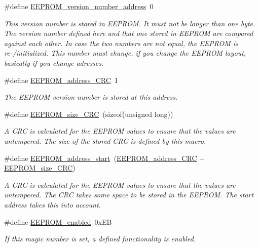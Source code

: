 \begin{DoxyCompactItemize}
\#define \hyperlink{WIFIOnOff_8ino_a573ec4699f45eaca686a077e5881d66b}{E\-E\-P\-R\-O\-M\-\_\-version\-\_\-number\-\_\-address}~0
\begin{DoxyCompactList}\small\item\em This version number is stored in E\-E\-P\-R\-O\-M. It must not be longer than one byte. The version number defined here and that one stored in E\-E\-P\-R\-O\-M are compared against each other. In case the two numbers are not equal, the E\-E\-P\-R\-O\-M is re-\//initialized. This number must change, if you change the E\-E\-P\-R\-O\-M layout, basically if you change adresses. \end{DoxyCompactList}\item 
\#define \hyperlink{WIFIOnOff_8ino_ab384daae78d017828d89c6d9c697021a}{E\-E\-P\-R\-O\-M\-\_\-address\-\_\-\-C\-R\-C}~1
\begin{DoxyCompactList}\small\item\em The E\-E\-P\-R\-O\-M version number is stored at this address. \end{DoxyCompactList}\item 
\#define \hyperlink{WIFIOnOff_8ino_af12bb22226c8f91f856f93ef2ddad3ec}{E\-E\-P\-R\-O\-M\-\_\-size\-\_\-\-C\-R\-C}~(sizeof(unsigned long))
\begin{DoxyCompactList}\small\item\em A C\-R\-C is calculated for the E\-E\-P\-R\-O\-M values to ensure that the values are untempered. The size of the stored C\-R\-C is defined by this macro. \end{DoxyCompactList}\item 
\#define \hyperlink{WIFIOnOff_8ino_a4e45a9ad8583fe2db7f42052e0a7ac95}{E\-E\-P\-R\-O\-M\-\_\-address\-\_\-start}~(\hyperlink{WIFIOnOff_8ino_ab384daae78d017828d89c6d9c697021a}{E\-E\-P\-R\-O\-M\-\_\-address\-\_\-\-C\-R\-C} + \hyperlink{WIFIOnOff_8ino_af12bb22226c8f91f856f93ef2ddad3ec}{E\-E\-P\-R\-O\-M\-\_\-size\-\_\-\-C\-R\-C})
\begin{DoxyCompactList}\small\item\em A C\-R\-C is calculated for the E\-E\-P\-R\-O\-M values to ensure that the values are untempered. The C\-R\-C takes some space to be stored in the E\-E\-P\-R\-O\-M. The start address takes this into account. \end{DoxyCompactList}\item 
\#define \hyperlink{WIFIOnOff_8ino_a06c93cd8175c0a438c20922e313645bd}{E\-E\-P\-R\-O\-M\-\_\-enabled}~0x\-E\-B
\begin{DoxyCompactList}\small\item\em If this magic number is set, a defined functionality is enabled. \end{DoxyCompactList}\item 

\end{DoxyCompactItemize}
